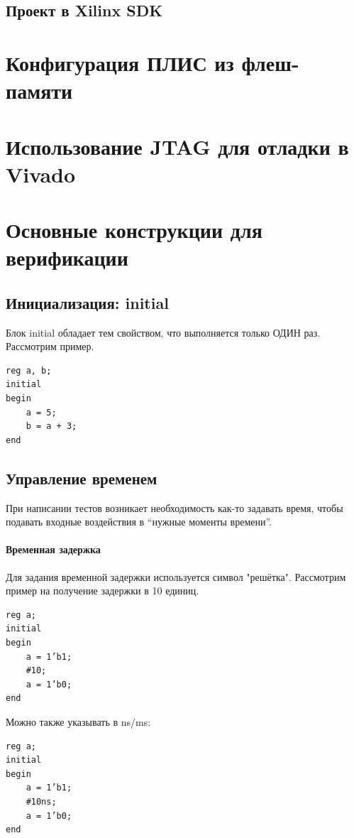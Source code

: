 \documentclass[a4paper,oneside ,10pt]{extreport}
\begin{document}
\section{Проект в Xilinx SDK}

\appendix
\chapter{Конфигурация ПЛИС из флеш-памяти}
\chapter{Использование JTAG для отладки в Vivado}
\chapter{Основные конструкции для верификации}
\section{Инициализация: initial}

Блок initial обладает тем свойством, что выполняется только ОДИН раз. Рассмотрим пример.

\begin{Verbatim}[tabsize=4]
reg a, b;
initial
begin
	a = 5;
	b = a + 3;
end
\end{Verbatim}

\section{Управление временем}

При написании тестов возникает необходимость как-то задавать время, чтобы подавать входные воздействия в “нужные моменты времени”. 

\subsubsection{Временная задержка}

Для задания временной задержки используется символ "решётка". Рассмотрим пример на получение задержки в 10 единиц.
\begin{Verbatim}[tabsize=4]
reg a;
initial
begin
	a = 1’b1;
	#10;
	a = 1’b0;
end
\end{Verbatim}

Можно также указывать в ns/ms:

\begin{Verbatim}[tabsize=4]
reg a;
initial
begin
	a = 1’b1;
	#10ns;
	a = 1’b0;
end
\end{Verbatim}
\end{document}
